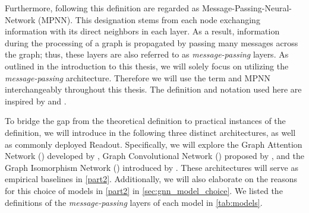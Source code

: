 Furthermore, \gnns following this definition are regarded as \textsf{Message-Passing-Neural-Network (MPNN)}. This designation stems from each node exchanging information with its direct neighbors in each layer. As a result, information during the processing of a graph is propagated by passing many messages across the graph; thus, these layers are also referred to as \textit{message-passing} layers. As outlined in the introduction to this thesis, we will solely focus on \gnns utilizing the \textit{message-passing} architecture. Therefore we will use the term \gnn and \textsf{MPNN} interchangeably throughout this thesis. The definition and notation used here are inspired by \cite{Morris2018} and \cite{Xu2018}.

To bridge the gap from the theoretical definition to practical instances of the definition, we will introduce in the following three distinct \gnn architectures, as well as commonly deployed \textsf{Readout}. Specifically, we will explore the \textsf{Graph Attention Network} (\gat) developed by \cite{Velivckovic2017}, \textsf{Graph Convolutional Network} (\gcn) proposed by \cite{Kip+2017}, and the \textsf{Graph Isomorphism Network} (\gin) introduced by \cite{Xu2018}. These architectures will serve as empirical baselines in \cref{part2}. Additionally, we will also elaborate on the reasons for this choice of models in \cref{part2} in \cref{sec:gnn_model_choice}. We listed the definitions of the \textit{message-passing} layers of each model in \cref{tab:models}.

\begin{table}[H]
    \centering
    \caption{Overview of the construction of the \textit{message-passing} layers and their respective learnable parameters by popular \gnn architectures. A complete definition of the \gat architecture including the attention coefficient $\alpha_{vu}$ can be found in \cref{def:gat} in the Appendix.}
    \label{tab:models}
\end{table}

